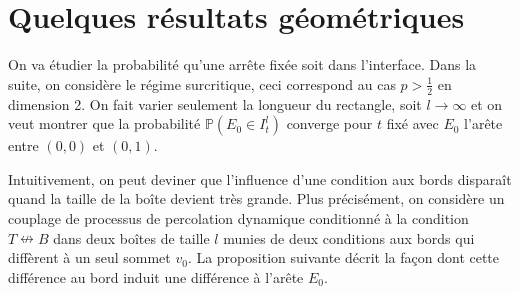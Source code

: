 \documentclass[titlepage,a4paper,11pt]{article}
\newcounter{prop}
\newcounter{cor}
\newcommand{\nconnect}{\nleftrightarrow}
\begin{document}
\section{Quelques résultats géométriques}
On va étudier la probabilité qu'une arrête fixée soit dans l'interface. Dans la suite, on considère le régime surcritique, ceci correspond au cas $p>\frac{1}{2}$ en dimension 2. On fait varier seulement la longueur du rectangle, soit $l \rightarrow \infty$ et on veut montrer que la probabilité $\mathbb{P}(E_0 \in I^l_t)$ converge pour $t$ fixé avec $E_0$ l'arête entre $(0,0)$ et $(0,1)$.

Intuitivement, on peut deviner que l'influence d'une condition aux bords disparaît quand la taille de la boîte devient très grande. Plus précisément, on considère un couplage de processus de percolation dynamique conditionné à la condition $T\nconnect B$ dans deux boîtes de taille $l$ munies de deux conditions aux bords qui diffèrent à un seul sommet $v_0$. La proposition suivante décrit la façon dont cette différence au bord induit une différence à l'arête $E_0$.
\end{document}
